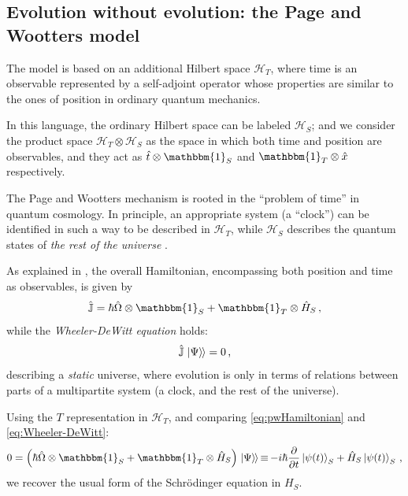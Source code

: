 \documentclass[a0,portrait]{a0poster}
\newcommand{\term}[1]{\emph{#1}}
\newcommand{\idop}{\mathbbm{1}}           %
\newcommand{\hilb}[1]{\mathcal{#1}}       %
\newcommand{\ox}{\otimes}
\DeclareMathOperator*{\repr}{\equiv}      %
\newcommand{\smallback}{\hspace{-0.115em}}
\newcommand{\dket}[1]{\left.\left| #1 \right\rangle\smallback\right\rangle}
\begin{document}
\begin{multicols}{2}
\color{DarkSlateGray} %

\section*{Evolution without evolution: the Page and Wootters model}

The model \cite{Lloyd:Time, Maccone:Pauli} is based on
an additional Hilbert space $\mathcal{H}_T$,
where time is an observable
represented by a self-adjoint operator
whose properties are similar to the ones of position
in ordinary quantum mechanics.

In this language, the ordinary Hilbert space can be labeled $\mathcal{H}_S$;
and we consider the product space $\mathcal{H}_T \otimes \mathcal{H}_S$ as
the space in which both time and position are observables, and they act as
$\hat{t} \otimes \idop_S$ and $\idop_T \otimes \hat{x}$
respectively.

The Page and Wootters mechanism is rooted in the ``problem of time''
in quantum cosmology.
In principle, an appropriate system (a ``clock'') can be identified in such a way
to be described in $\mathcal{H}_T$, while $\mathcal{H}_S$ describes
the quantum states of \emph{the rest of the universe} \cite{Marletto:Evolution}.

As explained in \cite{Lloyd:Time, Maccone:Pauli}, the overall Hamiltonian,
encompassing both position and time as observables, is given by
\begin{equation}\label{eq:pwHamiltonian}
  \hat{\mathbb{J}} = \hbar\hat{\Omega}\ox\idop_S + \idop_T\ox\hat{H}_S \,\text{,}
\end{equation}
while the \term{Wheeler-DeWitt equation} holds:
\begin{equation}\label{eq:Wheeler-DeWitt}
  \hat{\mathbb{J}}\dket{\Psi} = 0 \,\text{,}
\end{equation}
describing a \emph{static} universe, where evolution is only
in terms of relations between parts of a multipartite system
(a clock, and the rest of the universe).

Using the $T$ representation in $\hilb{H}_T$,
and comparing \eqref{eq:pwHamiltonian} and \eqref{eq:Wheeler-DeWitt}:
\begin{equation}\label{eq:schrod_from_pw}
  0 = \qty(\hbar\hat{\Omega}\ox\idop_S + \idop_{T}\ox\hat{H}_S)\dket{\Psi}
    \repr -i\hbar\pdv{t}\ket{\psi(t)}_{S} + \hat{H}_S\ket{\psi(t)}_{S}
    \,\text{,}
\end{equation}
we recover the usual form of the Schr\"{o}dinger equation in $H_S$.


\end{multicols}
\end{document}
